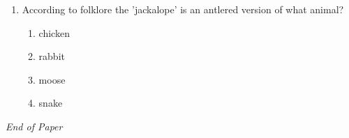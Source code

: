 \documentclass[12pt]{article}
\begin{document}
\begin{enumerate}[label=\arabic*.]
\begin{enumerate}[label=(\alph*)]
    \item steer
    \item park
    \item push
    \item brake
\end{enumerate}
\item According to folklore the 'jackalope' is an antlered version of what animal?
\begin{enumerate}[label=(\alph*)]
    \item chicken
    \item rabbit
    \item moose
    \item snake
\end{enumerate}
\end{enumerate}

\vfill
\noindent\textit{End of Paper}
\end{document}
